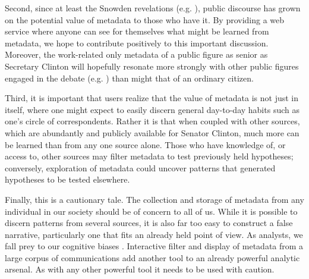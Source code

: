 \documentclass[journal]{vgtc}                %
\begin{document}
Second, since at least the Snowden revelations (e.g. \cite{NYRsnowdenLeaks}), public discourse has grown on the potential value of metadata to those who have it.  By providing a web service where anyone can see for themselves what might be learned from metadata, we hope to contribute positively to this important discussion.  Moreover, the work-related only metadata of a public figure as senior as Secretary Clinton will hopefully resonate more strongly with other public figures  engaged in the debate (e.g.   \cite{NYRmetadata, ObamaMetadata, JebBushMetadata2015, PompeoMetadata, TrumpMetadata}) than might that of an ordinary citizen.  

Third, it is important that users realize that the value of metadata is not just in itself, where one might expect to easily discern general day-to-day habits such as one's circle of correspondents.  Rather it is that when coupled with other sources, which are abundantly and publicly available for Senator Clinton, much more can be learned than from any one source alone.  Those who have knowledge of, or access to, other sources may filter metadata to test previously held hypotheses; conversely, exploration of metadata could uncover patterns that generated hypotheses to be tested elsewhere. 

Finally, this is a cautionary tale.  The collection and storage of metadata from any individual in our society should be of concern to all of us.  While it is possible to discern patterns from several sources, it is also far too easy to construct a false narrative, particularly one that fits an already held point of view.  As analysts, we fall prey to our cognitive biases \cite{gilgovichBook}.  Interactive filter and display of metadata from a large corpus of communications add another tool to an already powerful analytic arsenal.  As with any other powerful tool it needs to be used with caution.  


\newpage


%
%
%
%


\end{document}
